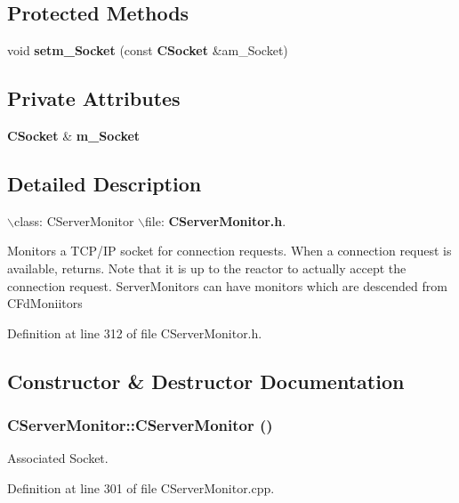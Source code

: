 \subsection*{Protected Methods}
\begin{CompactItemize}
\item 
void {\bf setm\_\-Socket} (const {\bf CSocket} \&am\_\-Socket)
\end{CompactItemize}
\subsection*{Private Attributes}
\begin{CompactItemize}
\item 
{\bf CSocket} \& {\bf m\_\-Socket}
\end{CompactItemize}


\subsection{Detailed Description}
$\backslash$class: CServer\-Monitor $\backslash$file: {\bf CServer\-Monitor.h}.

Monitors a TCP/IP socket for connection requests. When a connection request is available, returns. Note that it is up to the reactor to actually accept the connection request. Server\-Monitors can have monitors which are descended from CFd\-Moniitors 



Definition at line 312 of file CServer\-Monitor.h.

\subsection{Constructor \& Destructor Documentation}
\subsubsection{\setlength{\rightskip}{0pt plus 5cm}CServer\-Monitor::CServer\-Monitor ()}\label{classCServerMonitor_a0}


Associated Socket.



Definition at line 301 of file CServer\-Monitor.cpp.
